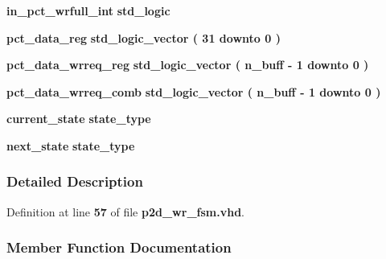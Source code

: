\begin{DoxyCompactItemize}
\item 
{\bf in\+\_\+pct\+\_\+wrfull\+\_\+int} {\bfseries \textcolor{comment}{std\+\_\+logic}\textcolor{vhdlchar}{ }} 
\item 
{\bf pct\+\_\+data\+\_\+reg} {\bfseries \textcolor{comment}{std\+\_\+logic\+\_\+vector}\textcolor{vhdlchar}{ }\textcolor{vhdlchar}{(}\textcolor{vhdlchar}{ }\textcolor{vhdlchar}{ } \textcolor{vhdldigit}{31} \textcolor{vhdlchar}{ }\textcolor{keywordflow}{downto}\textcolor{vhdlchar}{ }\textcolor{vhdlchar}{ } \textcolor{vhdldigit}{0} \textcolor{vhdlchar}{ }\textcolor{vhdlchar}{)}\textcolor{vhdlchar}{ }} 
\item 
{\bf pct\+\_\+data\+\_\+wrreq\+\_\+reg} {\bfseries \textcolor{comment}{std\+\_\+logic\+\_\+vector}\textcolor{vhdlchar}{ }\textcolor{vhdlchar}{(}\textcolor{vhdlchar}{ }\textcolor{vhdlchar}{ }\textcolor{vhdlchar}{ }\textcolor{vhdlchar}{ }{\bfseries {\bf n\+\_\+buff}} \textcolor{vhdlchar}{-\/}\textcolor{vhdlchar}{ } \textcolor{vhdldigit}{1} \textcolor{vhdlchar}{ }\textcolor{keywordflow}{downto}\textcolor{vhdlchar}{ }\textcolor{vhdlchar}{ } \textcolor{vhdldigit}{0} \textcolor{vhdlchar}{ }\textcolor{vhdlchar}{)}\textcolor{vhdlchar}{ }} 
\item 
{\bf pct\+\_\+data\+\_\+wrreq\+\_\+comb} {\bfseries \textcolor{comment}{std\+\_\+logic\+\_\+vector}\textcolor{vhdlchar}{ }\textcolor{vhdlchar}{(}\textcolor{vhdlchar}{ }\textcolor{vhdlchar}{ }\textcolor{vhdlchar}{ }\textcolor{vhdlchar}{ }{\bfseries {\bf n\+\_\+buff}} \textcolor{vhdlchar}{-\/}\textcolor{vhdlchar}{ } \textcolor{vhdldigit}{1} \textcolor{vhdlchar}{ }\textcolor{keywordflow}{downto}\textcolor{vhdlchar}{ }\textcolor{vhdlchar}{ } \textcolor{vhdldigit}{0} \textcolor{vhdlchar}{ }\textcolor{vhdlchar}{)}\textcolor{vhdlchar}{ }} 
\item 
{\bf current\+\_\+state} {\bfseries {\bfseries {\bf state\+\_\+type}} \textcolor{vhdlchar}{ }} 
\item 
{\bf next\+\_\+state} {\bfseries {\bfseries {\bf state\+\_\+type}} \textcolor{vhdlchar}{ }} 
\end{DoxyCompactItemize}


\subsubsection{Detailed Description}


Definition at line {\bf 57} of file {\bf p2d\+\_\+wr\+\_\+fsm.\+vhd}.



\subsubsection{Member Function Documentation}
